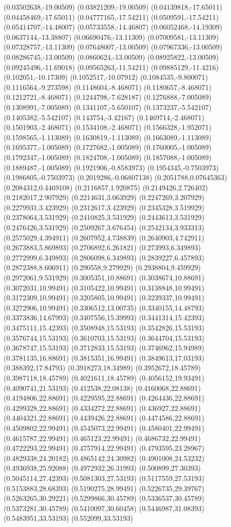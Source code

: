 \documentclass[12pt,letterpaper]{article}
\begin{document}
(0.03502638,-19.00509) (0.03821209,-19.00509) (0.04139818,-17.65011) (0.04458469,-17.65011) (0.04777165,-17.54211) (0.0509591,-17.54211) (0.05414707,-14.48007) (0.05733558,-14.46807) (0.06052468,-14.19309) (0.0637144,-13.38807) (0.06690476,-13.11309) (0.07009581,-13.11309) (0.07328757,-13.11309) (0.07648007,-13.00509) (0.07967336,-13.00509) (0.08286745,-13.00509) (0.0860624,-13.00509) (0.08925822,-13.00509) (0.09245496,-11.69018) (0.09565263,-11.54211) (0.09885129,-11.4216) (0.102051,-10.17309) (0.1052517,-10.07912) (0.1084535,-9.800071) (0.1116564,-9.273598) (0.1148604,-8.468071) (0.1180657,-8.468071) (0.1212721,-8.468071) (0.1244798,-7.628187) (0.1276888,-7.005089) (0.1308991,-7.005089) (0.1341107,-5.650107) (0.1373237,-5.542107) (0.1405382,-5.542107) (0.143754,-3.42167) (0.1469714,-2.468071) (0.1501903,-2.468071) (0.1534108,-2.468071) (0.1566328,-1.952071) (0.1598565,-1.113089) (0.1630819,-1.113089) (0.1663089,-1.113089) (0.1695377,-1.005089) (0.1727682,-1.005089) (0.1760005,-1.005089) (0.1792347,-1.005089) (0.1824708,-1.005089) (0.1857088,-1.005089) (0.1889487,-1.005089) (0.1921906,-0.8583973) (0.1954345,-0.7503973) (0.1986805,-0.7503973) (0.2019286,-0.06807138) (0.2051788,0.07645363) (0.2084312,0.4469108) (0.2116857,1.920875) (0.2149426,2.726402) (0.2182017,2.907929) (0.2214631,3.063929) (0.2247269,3.207929) (0.2279931,3.423929) (0.2312617,3.423929) (0.2345328,3.519929) (0.2378064,3.531929) (0.2410825,3.531929) (0.2443613,3.531929) (0.2476426,3.531929) (0.2509267,3.676454) (0.2542134,3.933313) (0.2575029,4.394911) (0.2607952,4.738839) (0.2640903,4.742911) (0.2673883,5.869893) (0.2706892,6.261821) (0.273993,6.349893) (0.2772999,6.349893) (0.2806098,6.349893) (0.2839227,6.457893) (0.2872388,8.606911) (0.290558,9.279929) (0.2938804,9.459929) (0.2972061,9.531929) (0.3005351,10.88691) (0.3038674,10.88691) (0.3072031,10.99491) (0.3105422,10.99491) (0.3138848,10.99491) (0.3172309,10.99491) (0.3205805,10.99491) (0.3239337,10.99491) (0.3272906,10.99491) (0.3306512,13.00735) (0.3340155,14.48793) (0.3373836,14.67993) (0.3407556,15.39993) (0.3441314,15.42393) (0.3475111,15.42393) (0.3508948,15.53193) (0.3542826,15.53193) (0.3576744,15.53193) (0.3610703,15.53193) (0.3644704,15.53193) (0.3678747,15.53193) (0.3712833,15.53193) (0.3746962,15.94989) (0.3781135,16.88691) (0.3815351,16.99491) (0.3849613,17.03193) (0.388392,17.84793) (0.3918273,18.34989) (0.3952672,18.45789) (0.3987118,18.45789) (0.4021611,18.45789) (0.4056152,19.93491) (0.4090741,21.53193) (0.412538,22.08138) (0.4160068,22.88691) (0.4194806,22.88691) (0.4229595,22.88691) (0.4264436,22.88691) (0.4299328,22.88691) (0.4334272,22.88691) (0.436927,22.88691) (0.4404321,22.88691) (0.4439426,22.88691) (0.4474586,22.88691) (0.4509802,22.99491) (0.4545073,22.99491) (0.4580401,22.99491) (0.4615787,22.99491) (0.465123,22.99491) (0.4686732,22.99491) (0.4722293,22.99491) (0.4757914,22.99491) (0.4793595,23.28967) (0.4829338,24.20182) (0.4865142,24.30982) (0.4901008,24.53232) (0.4936938,25.92088) (0.4972932,26.31993) (0.500899,27.30393) (0.5045114,27.42393) (0.5081303,27.53193) (0.5117559,27.53193) (0.5153883,28.68393) (0.5190275,28.99491) (0.5226735,29.39767) (0.5263265,30.29221) (0.5299866,30.45789) (0.5336537,30.45789) (0.5373281,30.45789) (0.5410097,30.60458) (0.5446987,31.08393) (0.5483951,33.53193) (0.552099,33.53193) 
\end{document}
